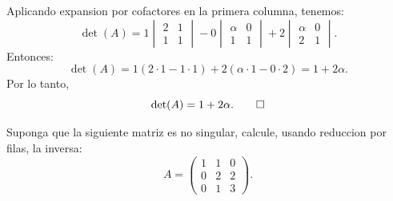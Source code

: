 \documentclass[11pt,respuestas,a4]{aleph-examen}
\begin{document}
\begin{preguntas}
\begin{respuesta}
    Aplicando expansion por cofactores en la primera columna, tenemos:
    \[
        \det(A)=
        1\begin{vmatrix}
            2 & 1 \\
            1 & 1
        \end{vmatrix}
        -0\begin{vmatrix}
            \alpha & 0 \\
            1 & 1
        \end{vmatrix}
        +2\begin{vmatrix}
            \alpha & 0 \\
            2 & 1
        \end{vmatrix}.
    \]
    Entonces:
    \[
        \det(A)=1(2\cdot 1-1\cdot 1)+2(\alpha\cdot 1-0\cdot 2)
        =1+2\alpha.
    \]
    Por lo tanto,
    \[
        \det(A)=1+2\alpha.\qedhere
    \]
\end{respuesta}

\item
    Suponga que la siguiente matriz es no singular, calcule, usando reduccion por filas, la inversa:
    \[
        A=\begin{pmatrix}
            1 & 1 & 0 \\
            0 & 2 & 2 \\
            0 & 1 & 3
        \end{pmatrix}.
    \]


\end{preguntas}
\end{document}
